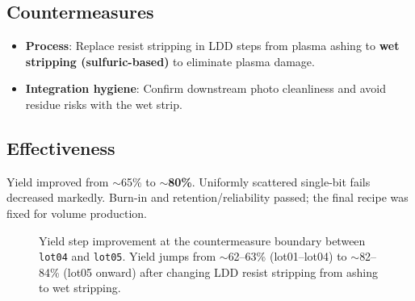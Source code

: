 \subsection{Countermeasures}
\begin{itemize}
  \item \textbf{Process}: Replace resist stripping in LDD steps from plasma ashing to \textbf{wet stripping (sulfuric-based)} to eliminate plasma damage. 
  \item \textbf{Integration hygiene}: Confirm downstream photo cleanliness and avoid residue risks with the wet strip.
\end{itemize}

\subsection{Effectiveness}
Yield improved from $\sim$65\% to \textbf{$\sim$80\%}. Uniformly scattered single-bit fails decreased markedly. Burn-in and retention/reliability passed; the final recipe was fixed for volume production.

\begin{figure}[t]
\centering
{}\yieldtbl
{}
\caption{Yield step improvement at the countermeasure boundary
between \texttt{lot04} and \texttt{lot05}. Yield jumps from $\sim$62--63\% 
(lot01--lot04) to $\sim$82--84\% (lot05 onward) after changing 
LDD resist stripping from ashing to wet stripping.}
\label{fig:yield}
\end{figure}
